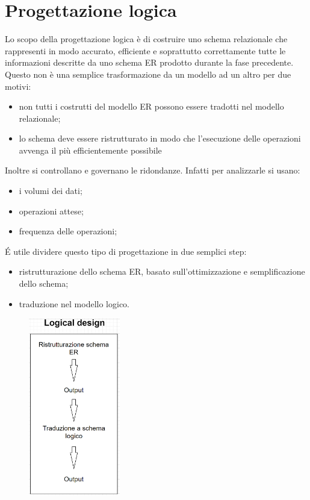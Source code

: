 \documentclass[legalpaper]{article}
\begin{document}
	\section{Progettazione logica}
		Lo scopo della progettazione logica è di costruire uno schema relazionale che rappresenti in modo accurato, efficiente e soprattutto correttamente tutte le informazioni descritte da uno schema ER prodotto durante la fase precedente. \\
		Questo non è una semplice trasformazione da un modello ad un altro per due motivi:
		\begin{itemize}
			\item non tutti i costrutti del modello ER possono essere tradotti nel modello relazionale;
			\item lo schema deve essere ristrutturato in modo che l'esecuzione delle operazioni avvenga il più efficientemente possibile
		\end{itemize}
		Inoltre si controllano e governano le ridondanze. Infatti per analizzarle si usano: 
		\begin{itemize}
			\item i volumi dei dati;
			\item operazioni attese;
			\item frequenza delle operazioni;
		\end{itemize}
		\'E utile dividere questo tipo di progettazione in due semplici step:
		\begin{itemize}
			\item ristrutturazione dello schema ER, basato sull'ottimizzazione e semplificazione dello schema;
			\item traduzione nel modello logico.
		\end{itemize}
		\begin{figure}[ht]
			\includegraphics[width=4cm]{Schema Prog. Logica}
		\end{figure}
\end{document}
